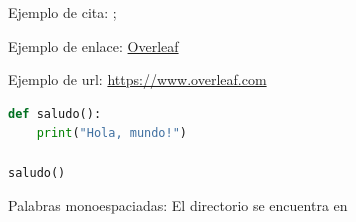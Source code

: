 Ejemplo de cita: \cite{dinosaurios2006}; \parencite{dinosaurios2006}

Ejemplo de enlace: \href{https://www.overleaf.com}{Overleaf}

Ejemplo de url: \url{https://www.overleaf.com}

\begin{lstlisting}[language=Python, caption=Hola Mundo en Python]
def saludo():
    print("Hola, mundo!")

saludo()
\end{lstlisting}

\begin{sloppypar}
    Palabras monoespaciadas: El directorio  se encuentra en 
\end{sloppypar}
